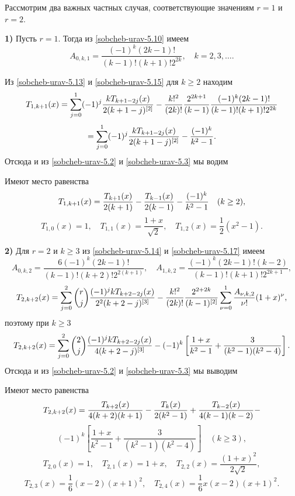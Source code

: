 Рассмотрим два важных частных случая, соответствующие  значениям   $r=1$  и $r=2$.

\noindent\textbf{1)} Пусть $r=1$. Тогда из \eqref{sobcheb-urav-5.10} имеем
\begin{equation}\label{sobcheb-urav-5.15}
A_{0,k,1}=\frac{(-1)^{k}(2k-1)!}{(k-1)!(k+1)!2^{2k}}, \quad k=2,3,\ldots.
\end{equation}

Из \eqref{sobcheb-urav-5.13} и \eqref{sobcheb-urav-5.15}  для $k\ge2$ находим
$$
T_{1,k+1}(x)=\sum_{j=0}^1(-1)^j
{kT_{k+1-2j}(x)\over2(k+1-j)^{[2]}}-\frac{k!^2}{(2k)!}
\frac{2^{2k+1}}{(k-1)}\frac{(-1)^{k}(2k-1)!}{(k-1)!(k+1)!2^{2k}}
$$
$$
=\sum_{j=0}^1(-1)^j
{kT_{k+1-2j}(x)\over2(k+1-j)^{[2]}}-\frac{(-1)^k}{k^2-1}.
$$
Отсюда и из \eqref{sobcheb-urav-5.2} и \eqref{sobcheb-urav-5.3} мы водим
\begin{corollary}\label{sobcheb-uravcor5}
Имеют место равенства
\begin{equation}\label{sobcheb-urav-5.16}
T_{1,k+1}(x)={T_{k+1}(x)\over2(k+1)}- {T_{k-1}(x)\over2(k-1)} -\frac{(-1)^k}{k^2-1}\quad (k\ge 2),
\end{equation}
\begin{equation}\label{sobcheb-urav-5.17}
T_{1,0}(x)=1, \quad T_{1,1}(x)=\frac{1+x}{\sqrt{2}}, \quad T_{1,2}(x)=\frac12(x^2-1).
\end{equation}
\end{corollary}


\noindent\textbf{2)} Для $r=2$ и $k\ge3$ из \eqref{sobcheb-urav-5.14} и \eqref{sobcheb-urav-5.17} имеем
$$
A_{0,k,2}=\frac{6(-1)^{k}(2k-1)!}{(k-1)! (k+2)!2^{2(k+1)}},\quad A_{1,k,2}=\frac{(-1)^{k}(2k-1)!(k-2)}{(k-1)! (k+1)!2^{2k+1}},
$$
$$
T_{2,k+2}(x)=\sum_{j=0}^2{r\choose j}
{(-1)^jkT_{k+2-2j}(x)\over2^2(k+2-j)^{[3]}}
-\frac{k!^2}{(2k)!}
\frac{2^{2+2k}}{(k-1)^{[2]}}\sum^1_{\nu=0}\frac{A_{\nu,k,2}}{\nu!}(1+x)^{\nu},
$$
поэтому при $k\ge3$
$$
T_{2,k+2}(x)=\sum_{j=0}^2{2\choose j}
{(-1)^jkT_{k+2-2j}(x)\over4(k+2-j)^{[3]}}
-(-1)^k\left[\frac{1+x}{k^2-1}+\frac{3}{(k^2-1)(k^2-4)}\right].
$$
Отсюда и из \eqref{sobcheb-urav-5.2} и \eqref{sobcheb-urav-5.3} мы выводим
\begin{corollary} Имеют место равенства
$$
T_{2,k+2}(x)={T_{k+2}(x)\over4(k+2)(k+1)}-{T_{k}(x)\over2(k^2-1)}+
{T_{k-2}(x)\over4(k-1)(k-2)}-
$$
\begin{equation}\label{sobcheb-urav-5.18}
(-1)^k\left[\frac{1+x}{k^2-1}+\frac{3}{(k^2-1)(k^2-4)}\right]\quad(k\ge3),
\end{equation}
\begin{equation}\label{sobcheb-urav-5.19}
T_{2,0}(x)=1, \quad T_{2,1}(x)=1+x, \quad T_{2,2}(x)=\frac{(1+x)^2}{2\sqrt{2}},
\end{equation}
\begin{equation}\label{sobcheb-urav-5.20}
T_{2,3}(x)=\frac16(x-2)(x+1)^2, \quad T_{2,4}(x)=\frac16x(x-2)(x+1)^2.
\end{equation}
\end{corollary}

